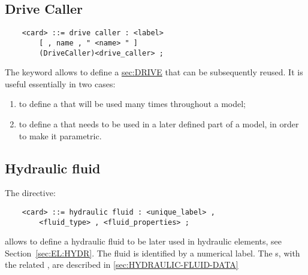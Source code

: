 \subsection{Drive Caller}\label{sec:DRIVE-CALLER}
\begin{verbatim}
    <card> ::= drive caller : <label>
        [ , name , " <name> " ]
        (DriveCaller)<drive_caller> ;
\end{verbatim}
The keyword  allows to define
a \hyperref{\kw{drive caller}}{\kw{drive caller} (see Section~}{)}{sec:DRIVE}
that can be subsequently reused.
It is useful essentially in two cases:
\begin{enumerate}
	\renewcommand{\labelenumi}{\alph{enumi})}
	\item to define a 
	that will be used many times throughout a model;
	\item to define a  
	that needs to be used in a later defined part of a model, 
	in order to make it parametric.
\end{enumerate}



\subsection{Hydraulic fluid}\label{sec:HYDRAULIC-FLUID}
The  directive:
\begin{verbatim}
    <card> ::= hydraulic fluid : <unique_label> , 
        <fluid_type> , <fluid_properties> ;
\end{verbatim}
allows to define a hydraulic fluid to be later used in hydraulic elements,
see Section~\ref{sec:EL:HYDR}.
The fluid is identified by a numerical label. 
The s, with the related , are
described in \ref{sec:HYDRAULIC-FLUID-DATA}



